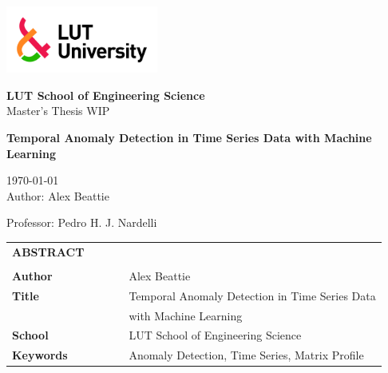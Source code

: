 \documentclass[a4paper,12pt]{article}
\begin{document}
\thispagestyle{empty}

% 

\begin{flushleft}
\includegraphics[width=5cm]{Images/lut5.jpg}

\textbf{LUT School of Engineering Science}\\
Master's Thesis WIP\\


\end{flushleft}

\begin{center}
\vfill
\textbf{Temporal Anomaly Detection in Time Series Data with Machine Learning}\\
\vfill
\end{center}

\begin{flushright}
\today \\ %
Author: Alex Beattie %

Professor: Pedro H. J. Nardelli\\ %

\end{flushright}
\titlepage
{}

\newpage

\noindent
\begin{table}[]
\begin{tabular}{lllll}
\textbf{ABSTRACT} \\                                                                                    
\\                                                                                                  
\textbf{Author}         &  &  &  & Alex Beattie\\
\textbf{Title}          &  &  &  & Temporal Anomaly Detection in Time Series Data  \\
                        &  &  &  & with Machine Learning  \\
\textbf{School}         &  &  &  & LUT School of Engineering Science \\
\textbf{Keywords}       &  &  &  & Anomaly Detection, Time Series, Matrix Profile \\

\end{tabular}
\end{table}
\end{document}
